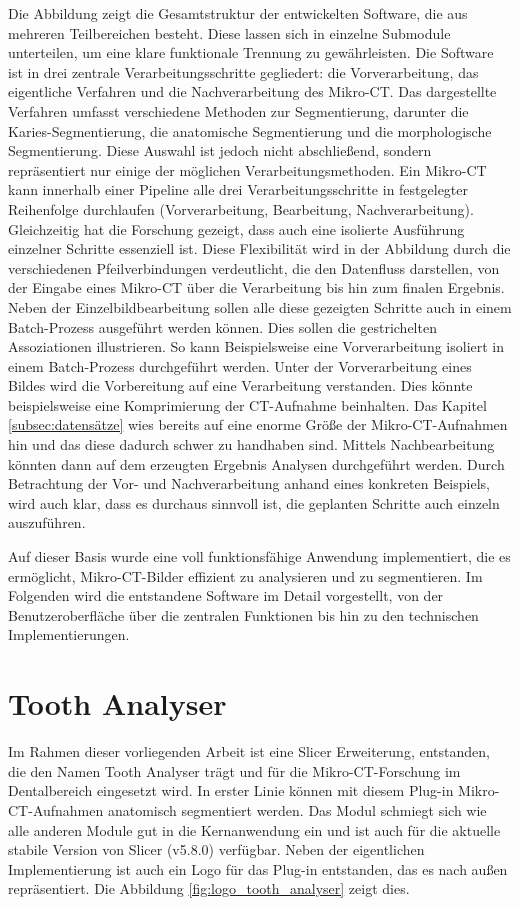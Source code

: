 Die Abbildung zeigt die Gesamtstruktur der entwickelten Software, die aus mehreren
Teilbereichen besteht. Diese lassen sich in einzelne Submodule unterteilen, um eine
klare funktionale Trennung zu gewährleisten. Die Software ist in drei zentrale
Verarbeitungsschritte gegliedert: die Vorverarbeitung, das eigentliche Verfahren
und die Nachverarbeitung des Mikro-\ac{CT}. Das dargestellte Verfahren umfasst
verschiedene Methoden zur Segmentierung, darunter die Karies-Segmentierung, die
anatomische Segmentierung und die morphologische Segmentierung. Diese Auswahl ist
jedoch nicht abschließend, sondern repräsentiert nur einige der möglichen
Verarbeitungsmethoden. Ein Mikro-\ac{CT} kann innerhalb einer Pipeline alle drei
Verarbeitungsschritte in festgelegter Reihenfolge durchlaufen (Vorverarbeitung,
Bearbeitung, Nachverarbeitung). Gleichzeitig hat die Forschung gezeigt, dass
auch eine isolierte Ausführung einzelner Schritte essenziell ist. Diese Flexibilität
wird in der Abbildung durch die verschiedenen Pfeilverbindungen verdeutlicht,
die den Datenfluss darstellen, von der Eingabe eines Mikro-\ac{CT} über die
Verarbeitung bis hin zum finalen Ergebnis. Neben der Einzelbildbearbeitung sollen
alle diese gezeigten Schritte auch in einem Batch-Prozess ausgeführt werden können.
Dies sollen die gestrichelten Assoziationen illustrieren. So kann Beispielsweise
eine Vorverarbeitung isoliert in einem Batch-Prozess durchgeführt werden. Unter
der Vorverarbeitung eines Bildes wird die Vorbereitung auf eine Verarbeitung
verstanden. Dies könnte beispielsweise eine Komprimierung der \ac{CT}-Aufnahme
beinhalten. Das Kapitel \ref{subsec:datensätze} wies bereits auf eine enorme Größe
der Mikro-\ac{CT}-Aufnahmen hin und das diese dadurch schwer zu handhaben sind. Mittels
Nachbearbeitung könnten dann auf dem erzeugten Ergebnis Analysen durchgeführt werden.
Durch Betrachtung der Vor- und Nachverarbeitung anhand eines konkreten Beispiels,
wird auch klar, dass es durchaus sinnvoll ist, die geplanten Schritte auch
einzeln auszuführen.

Auf dieser Basis wurde eine voll funktionsfähige Anwendung implementiert, die es
ermöglicht, Mikro-\ac{CT}-Bilder effizient zu analysieren und zu segmentieren.
Im Folgenden wird die entstandene Software im Detail vorgestellt, von der Benutzeroberfläche
über die zentralen Funktionen bis hin zu den technischen Implementierungen.

\section{Tooth Analyser}
\label{sec:tooth_analyser} Im Rahmen dieser vorliegenden Arbeit ist eine Slicer Erweiterung,
entstanden, die den Namen Tooth Analyser trägt und für die Mikro-\ac{CT}-Forschung
im Dentalbereich eingesetzt wird. In erster Linie können mit diesem Plug-in Mikro-\ac{CT}-Aufnahmen
anatomisch segmentiert werden. Das Modul schmiegt sich wie alle anderen Module gut
in die Kernanwendung ein und ist auch für die aktuelle stabile Version von Slicer
(v5.8.0) verfügbar. Neben der eigentlichen Implementierung ist auch ein Logo für
das Plug-in entstanden, das es nach außen repräsentiert. Die Abbildung
\ref{fig:logo_tooth_analyser} zeigt dies.

